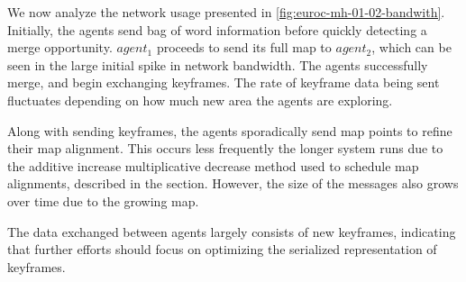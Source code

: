We now analyze the network usage presented in \autoref{fig:euroc-mh-01-02-bandwith}. Initially, the agents send bag of word information before quickly detecting a merge opportunity. $agent_1$ proceeds to send its full map to $agent_2$, which can be seen in the large initial spike in network bandwidth. The agents successfully merge, and begin exchanging keyframes. The rate of keyframe data being sent fluctuates depending on how much new area the agents are exploring.

Along with sending keyframes, the agents sporadically send map points to refine their map alignment. This occurs less frequently the longer system runs due to the additive increase multiplicative decrease method used to schedule map alignments, described in the  section. However, the size of the messages also grows over time due to the growing map.

The data exchanged between agents largely consists of new keyframes, indicating that further efforts should focus on optimizing the serialized representation of keyframes.

